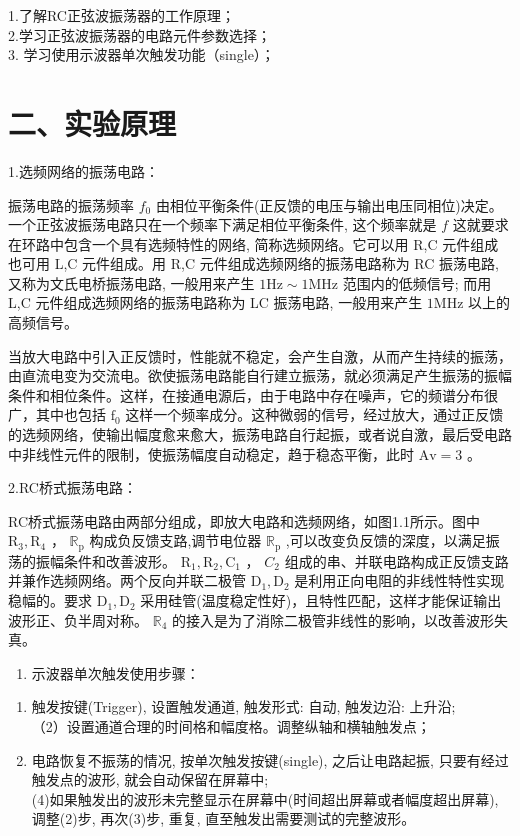 \documentclass[
  10
]{article}
\providecommand{\tightlist}{%
  \setlength{\itemsep}{0pt}\setlength{\parskip}{0pt}}
\begin{document}
1.了解RC正弦波振荡器的工作原理；\\
2.学习正弦波振荡器的电路元件参数选择；\\
3. 学习使用示波器单次触发功能（single）；

\section{二、实验原理}\label{ux4e8cux5b9eux9a8cux539fux7406-3}

1.选频网络的振荡电路：

振荡电路的振荡频率 \(f_0\)
由相位平衡条件(正反馈的电压与输出电压同相位)决定。一个正弦波振荡电路只在一个频率下满足相位平衡条件,
这个频率就是 \(f\) 这就要求在环路中包含一个具有选频特性的网络,
简称选频网络。它可以用 R,C 元件组成也可用 L,C 元件组成。用 R,C
元件组成选频网络的振荡电路称为 RC 振荡电路, 又称为文氏电桥振荡电路,
一般用来产生 \(1\mathrm{Hz} \sim 1\mathrm{MHz}\) 范围内的低频信号; 而用
L,C 元件组成选频网络的振荡电路称为 LC 振荡电路, 一般用来产生
\(1\mathrm{MHz}\) 以上的高频信号。

当放大电路中引入正反馈时，性能就不稳定，会产生自激，从而产生持续的振荡，由直流电变为交流电。欲使振荡电路能自行建立振荡，就必须满足产生振荡的振幅条件和相位条件。这样，在接通电源后，由于电路中存在噪声，它的频谱分布很广，其中也包括
\(\mathrm{f}_0\)
这样一个频率成分。这种微弱的信号，经过放大，通过正反馈的选频网络，使输出幅度愈来愈大，振荡电路自行起振，或者说自激，最后受电路中非线性元件的限制，使振荡幅度自动稳定，趋于稳态平衡，此时
\(\mathrm{Av} = 3\) 。

2.RC桥式振荡电路：

RC桥式振荡电路由两部分组成，即放大电路和选频网络，如图1.1所示。图中
\(\mathrm{R}_3,\mathrm{R}_4\) ， \(\mathbb{R}_{\mathrm{p}}\)
构成负反馈支路,调节电位器 \(\mathbb{R}_{\mathrm{p}}\)
,可以改变负反馈的深度，以满足振荡的振幅条件和改善波形。
\(\mathrm{R_1,R_2,C_1}\) ， \(C_2\)
组成的串、并联电路构成正反馈支路并兼作选频网络。两个反向并联二极管
\(\mathrm{D}_1,\mathrm{D}_2\) 是利用正向电阻的非线性特性实现稳幅的。要求
\(\mathrm{D}_1,\mathrm{D}_2\)
采用硅管(温度稳定性好)，且特性匹配，这样才能保证输出波形正、负半周对称。
\(\mathbb{R}_4\) 的接入是为了消除二极管非线性的影响，以改善波形失真。

\begin{enumerate}
\def\labelenumi{\arabic{enumi}.}
\setcounter{enumi}{2}
\tightlist
\item
  示波器单次触发使用步骤：
\end{enumerate}

\begin{enumerate}
\def\labelenumi{\arabic{enumi}.}
\tightlist
\item
  触发按键(Trigger), 设置触发通道, 触发形式: 自动, 触发边沿: 上升沿;\\
  （2）设置通道合理的时间格和幅度格。调整纵轴和横轴触发点；\\
\item
  电路恢复不振荡的情况, 按单次触发按键(single), 之后让电路起振,
  只要有经过触发点的波形, 就会自动保留在屏幕中;\\
  (4)如果触发出的波形未完整显示在屏幕中(时间超出屏幕或者幅度超出屏幕),
  调整(2)步, 再次(3)步, 重复, 直至触发出需要测试的完整波形。
\end{enumerate}
\end{document}
